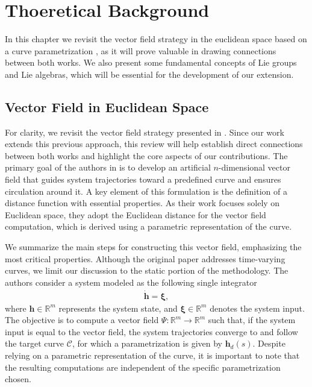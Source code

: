 \chapter{Thoeretical Background}\label{ch:background}
In this chapter we revisit the vector field strategy in the euclidean space based on a curve parametrization \citep{Rezende2022}, as it will prove valuable in drawing connections between both works. We also present some fundamental concepts of Lie groups and Lie algebras, which will be essential for the development of our extension.

\section{Vector Field in Euclidean Space}\label{sec:adriano-review}
For clarity, we revisit the vector field strategy presented in \citet{Rezende2022}. Since our work extends this previous approach, this review will help establish direct connections between both works and highlight the core aspects of our contributions. The primary goal of the authors in \citet{Rezende2022} is to develop an artificial $n$-dimensional vector field that guides system trajectories toward a predefined curve and ensures circulation around it. A key element of this formulation is the definition of a distance function with essential properties. As their work focuses solely on Euclidean space, they adopt the Euclidean distance for the vector field computation, which is derived using a parametric representation of the curve.

We summarize the main steps for constructing this vector field, emphasizing the most critical properties. Although the original paper addresses time-varying curves, we limit our discussion to the static portion of the methodology. The authors consider a system modeled as the following single integrator 
\begin{align}
    \dot{\mathbf{h}} = \boldsymbol{\xi}, \label{eq:adriano-single-integrator}
\end{align}
where $\mathbf{h}\in\mathbb{R}^m$ represents the system state, and $\boldsymbol{\xi}\in\mathbb{R}^m$ denotes the system input. The objective is to compute a vector field $\Psi:\mathbb{R}^m\to\mathbb{R}^m$ such that, if the system input is equal to the vector field, the system trajectories converge to and follow the target curve $\mathcal{C}$, for which a parametrization is given by $\mathbf{h}_d(s)$. Despite relying on a parametric representation of the curve, it is important to note that the resulting computations are independent of the specific parametrization chosen.

